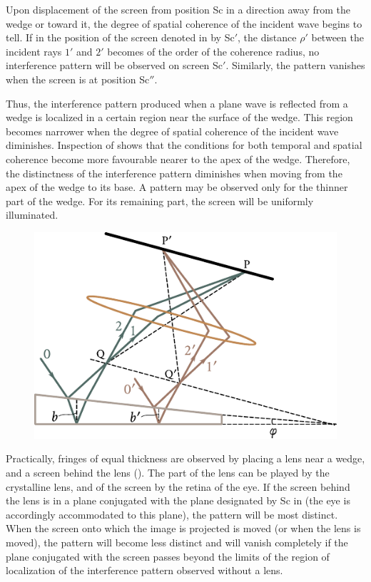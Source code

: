 Upon displacement of the screen from position Sc in a direction away from the wedge or toward it, the degree of spatial coherence of the incident wave begins to tell.
If in the position of the screen denoted in  by Sc$'$, the distance $\rho'$ between the incident rays $1'$ and $2'$ becomes of the order of the coherence radius, no interference pattern will be observed on screen Sc$'$.
Similarly, the pattern vanishes when the screen is at position Sc$''$.

Thus, the interference pattern produced when a plane wave is reflected from a wedge is localized in a certain region near the surface of the wedge.
This region becomes narrower when the degree of spatial coherence of the incident wave diminishes.
Inspection of  shows that the conditions for both temporal and spatial coherence
become more favourable nearer to the apex of the wedge.
Therefore, the distinctness of the interference pattern diminishes when moving from the apex of the wedge to its base.
A pattern may be observed only for the thinner part of the wedge.
For its remaining part, the screen will be uniformly illuminated.

\begin{figure}[t]
	\begin{center}
		\includegraphics[scale=0.9]{figures/ch_17/fig_17_14.pdf}
		\caption[]{}
		\label{fig:17_14}
	\end{center}
	\vspace{-0.8cm}
\end{figure}

Practically, fringes of equal thickness are observed by placing a lens near a wedge, and a screen behind the lens ().
The part of the lens can be played by the crystalline lens, and of the screen by the retina of the eye.
If the screen behind the lens is in a plane conjugated with the plane designated by Sc in  (the eye is accordingly accommodated to this plane), the pattern will be most distinct.
When the screen onto which the image is projected is moved (or when the lens is moved), the pattern will become less distinct and will vanish completely if the plane conjugated with the screen passes beyond the limits of the region of localization of the interference pattern observed without a lens.

